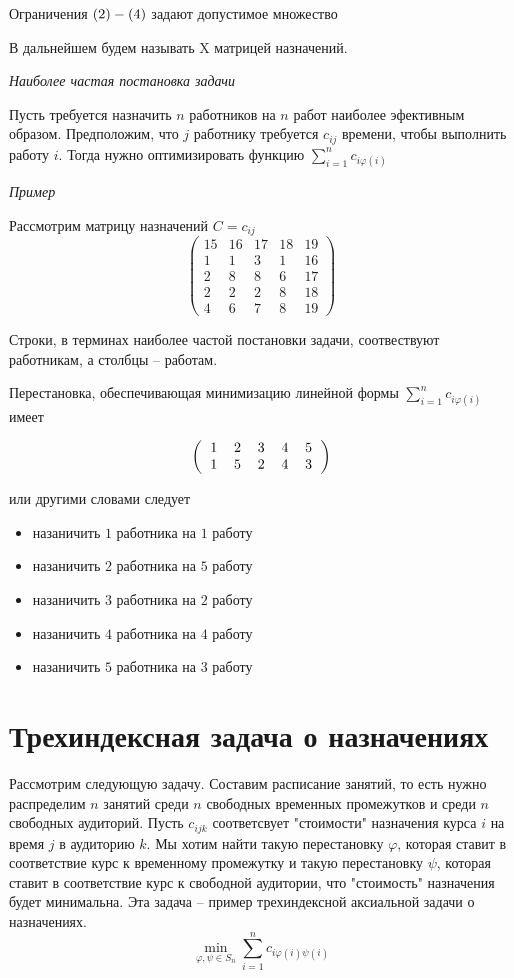 \documentclass[14pt,a4paper]{article}
\begin{document}
Ограничения  $(2) \-- (4)$ задают допустимое множество

В дальнейшем будем называть $\mathrm{X}$ матрицей назначений.


\textit{Наиболее частая постановка задачи}

Пусть требуется назначить $n$ работников на $n$ работ наиболее эфективным образом.
Предположим, что $j$ работнику требуется $c_{ij}$ времени, чтобы выполнить работу
$i$. Тогда нужно оптимизировать функцию
$\sum^n_{i = 1} c_{i \varphi(i)} $

\textit{Пример}

Рассмотрим матрицу назначений $C={c_{ij}}$
\[ \left(
\begin{matrix}
15 & 16 & 17 & 18 & 19 \\
1 & 1 & 3 & 1 & 16 \\
2 & 8 & 8 & 6 & 17 \\
2 & 2 & 2 & 8 & 18 \\
4 & 6 & 7 & 8 & 19
\end{matrix} \right)
\]

Строки, в терминах наиболее частой постановки задачи, соотвествуют работникам,
а столбцы -- работам.

Перестановка, обеспечивающая минимизацию линейной формы $\sum^n_{i = 1}
c_{i \varphi (i)}$ имеет

\[
\left (
  \begin{tabular}{ccccc}
  1 & 2 & 3 & 4 & 5\\
  1 & 5 & 2 & 4 & 3
  \end{tabular}
\right )
\]



или другими словами следует
\begin{itemize}
\item назаничить $1$ работника на $1$ работу
\item назаничить $2$ работника на $5$ работу
\item назаничить $3$ работника на $2$ работу
\item назаничить $4$ работника на $4$ работу
\item назаничить $5$ работника на $3$ работу
\end{itemize}


\section{Трехиндексная задача о назначениях}

Рассмотрим следующую задачу.
Составим расписание занятий, то есть нужно распределим $n$ занятий
среди $n$ свободных временных промежутков и среди $n$ свободных аудиторий.
Пусть $c_{ijk}$ соответсвует "стоимости" назначения курса $i$ на время $j$
в аудиторию $k$. Мы хотим найти такую перестановку $\varphi$, которая ставит
в соответствие курс к временному промежутку и такую перестановку $\psi$,
которая ставит
в соответствие курс к свободной аудитории, что "стоимость" назначения будет
минимальна. Эта задача -- пример трехиндексной аксиальной задачи о назначениях.
\[
 \min_{\varphi , \psi \in S_n} \sum^{n}_{i = 1} c_{i \varphi (i) \psi (i) }
\]
\end{document}
